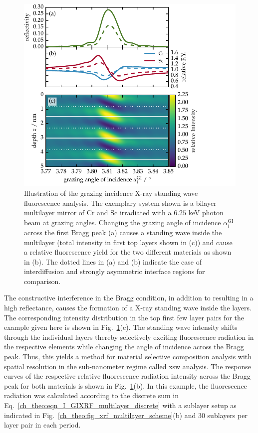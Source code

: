 \begin{figure}[htb]
        \includegraphics{img/XRF_scheme}
        \caption[X-ray standing wave fluorescence principle.]{%
            Illustration of the grazing incidence X-ray standing wave fluorescence analysis. The exemplary system shown is a bilayer multilayer mirror of Cr and Sc irradiated with a $6.25$ keV photon beam at grazing angles. Changing the grazing angle of incidence $\alpha_i^\text{GI}$ across the first Bragg peak (a) causes a standing wave inside the multilayer (total intensity in first top layers shown in (c)) and cause a relative fluorescence yield for the two different materials as shown in (b). The dotted lines in (a) and (b) indicate the case of interdiffusion and strongly asymmetric interface regions for comparison.}
        \label{ch_theo:fig_xrf_scheme}
\end{figure}

The constructive interference in the Bragg condition, in addition to resulting in a high reflectance, causes the formation of a X-ray standing wave inside the layers. The corresponding intensity distribution in the top first few layer pairs for the example given here is shown in Fig.~\ref{ch_theo:fig_xrf_scheme}(c). The standing wave intensity shifts through the individual layers thereby selectively exciting fluorescence radiation in the respective elements while changing the angle of incidence across the Bragg peak. Thus, this yields a method for material selective composition analysis with spatial resolution in the sub-nanometer regime called \gls{xsw} analysis. The response curves of the respective relative fluorescence radiation intensity across the Bragg peak for both materials is shown in Fig.~\ref{ch_theo:fig_xrf_scheme}(b). In this example, the fluorescence radiation was calculated according to the discrete sum in Eq.~\eqref{ch_theo:eqn_I_GIXRF_multilayer_discrete} with a sublayer setup as indicated in Fig.~\ref{ch_theo:fig_xrf_multilayer_scheme}(b) and $30$ sublayers per layer pair in each period.

